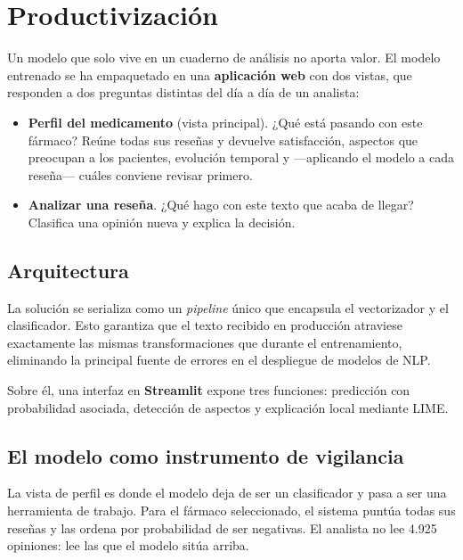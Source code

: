 \documentclass[11pt,a4paper]{article}
\begin{document}
\section{Productivización}\label{sec:productivizacion}

Un modelo que solo vive en un cuaderno de análisis no aporta valor. El modelo
entrenado se ha empaquetado en una \textbf{aplicación web} con dos vistas, que
responden a dos preguntas distintas del día a día de un analista:

\begin{itemize}[nosep,leftmargin=*]
  \item \textbf{Perfil del medicamento} (vista principal). ¿Qué está pasando
        con este fármaco? Reúne todas sus reseñas y devuelve satisfacción,
        aspectos que preocupan a los pacientes, evolución temporal y —aplicando
        el modelo a cada reseña— cuáles conviene revisar primero.
  \item \textbf{Analizar una reseña}. ¿Qué hago con este texto que acaba de
        llegar? Clasifica una opinión nueva y explica la decisión.
\end{itemize}

\subsection{Arquitectura}

La solución se serializa como un \textit{pipeline} único que encapsula el
vectorizador y el clasificador. Esto
garantiza que el texto recibido en producción atraviese exactamente las mismas
transformaciones que durante el entrenamiento, eliminando la principal fuente
de errores en el despliegue de modelos de NLP.

Sobre él, una interfaz en \textbf{Streamlit} expone tres funciones:
predicción con probabilidad asociada, detección de aspectos y explicación local
mediante LIME.

\subsection{El modelo como instrumento de vigilancia}

La vista de perfil es donde el modelo deja de ser un clasificador y pasa a ser
una herramienta de trabajo. Para el fármaco seleccionado, el sistema puntúa
todas sus reseñas y las ordena por probabilidad de ser negativas. El analista
no lee 4.925 opiniones: lee las que el modelo sitúa arriba.
\end{document}
